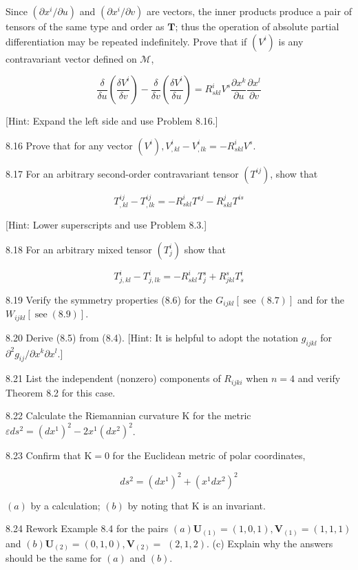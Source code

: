 \documentclass[10pt]{article}
\begin{document}
Since $\left(\partial x^{i} / \partial u\right)$ and $\left(\partial x^{i} / \partial v\right)$ are vectors, the inner products produce a pair of tensors of the same type and order as $\mathbf{T}$; thus the operation of absolute partial differentiation may be repeated indefinitely. Prove that if $\left(V^{i}\right)$ is any contravariant vector defined on $\mathcal{M}$,

$$
\frac{\delta}{\delta u}\left(\frac{\delta V^{i}}{\delta v}\right)-\frac{\delta}{\delta v}\left(\frac{\delta V^{i}}{\delta u}\right)=R_{s k l}^{i} V^{s} \frac{\partial x^{k}}{\partial u} \frac{\partial x^{l}}{\partial v}
$$

[Hint: Expand the left side and use Problem 8.16.]

8.16 Prove that for any vector $\left(V^{i}\right), V_{, k l}^{i}-V_{, l k}^{i}=-R_{s k l}^{i} V^{s}$.

8.17 For an arbitrary second-order contravariant tensor $\left(T^{i j}\right)$, show that

$$
T_{, k l}^{i j}-T_{, l k}^{i j}=-R_{s k l}^{i} T^{s j}-R_{s k l}^{j} T^{i s}
$$

[Hint: Lower superscripts and use Problem 8.3.]

8.18 For an arbitrary mixed tensor $\left(T_{j}^{i}\right)$ show that

$$
T_{j, k l}^{i}-T_{j, l k}^{i}=-R_{s k l}^{i} T_{j}^{s}+R_{j k l}^{s} T_{s}^{i}
$$

8.19 Verify the symmetry properties (8.6) for the $G_{i j k l}[\operatorname{see}(8.7)]$ and for the $W_{i j k l}[\operatorname{see}(8.9)]$.

8.20 Derive (8.5) from (8.4). [Hint: It is helpful to adopt the notation $g_{i j k l}$ for $\partial^{2} g_{i j} / \partial x^{k} \partial x^{l}$.]

8.21 List the independent (nonzero) components of $R_{i j k i}$ when $n=4$ and verify Theorem 8.2 for this case.

8.22 Calculate the Riemannian curvature K for the metric $\varepsilon d s^{2}=\left(d x^{1}\right)^{2}-2 x^{1}\left(d x^{2}\right)^{2}$.

8.23 Confirm that $\mathrm{K}=0$ for the Euclidean metric of polar coordinates,

$$
d s^{2}=\left(d x^{1}\right)^{2}+\left(x^{1} d x^{2}\right)^{2}
$$

$(a)$ by a calculation; $(b)$ by noting that $\mathrm{K}$ is an invariant.

8.24 Rework Example 8.4 for the pairs $(a) \mathbf{U}_{(1)}=(1,0,1), \mathbf{V}_{(1)}=(1,1,1)$ and $(b) \mathbf{U}_{(2)}=(0,1,0), \mathbf{V}_{(2)}=$ $(2,1,2)$. (c) Explain why the answers should be the same for $(a)$ and $(b)$.
\end{document}
